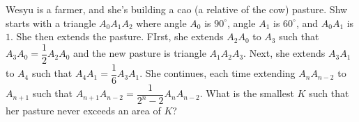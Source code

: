 Wesyu is a farmer, and she's building a cao (a relative of the cow) pasture.  Shw starts with a triangle $A_0A_1A_2$ where angle $A_0$ is $90^\circ$, angle $A_1$ is $60^\circ$, and $A_0A_1$ is $1$.  She then extends the pasture.  FIrst, she extends $A_2A_0$ to $A_3$ such that $A_3A_0=\dfrac12A_2A_0$ and the new pasture is triangle $A_1A_2A_3$.  Next, she extends $A_3A_1$ to $A_4$ such that $A_4A_1=\dfrac16A_3A_1$.  She continues, each time extending $A_nA_{n-2}$ to $A_{n+1}$ such that $A_{n+1}A_{n-2}=\dfrac1{2^n-2}A_nA_{n-2}$.  What is the smallest $K$ such that her pasture never exceeds an area of $K$?